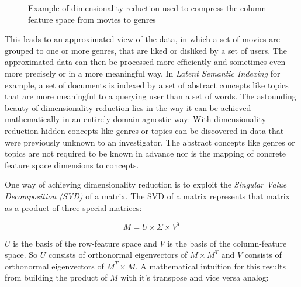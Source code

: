 \begin{figure}[h]
\centering
{}
\caption{Example of dimensionality reduction used to compress the column
feature space from movies to genres}
\label{fig:exmpl_dr}
\end{figure}

This leads to an approximated view of the data, in which a set of movies are
grouped to one or more genres, that are liked or disliked by a set of users.
The approximated data can then be processed more efficiently and sometimes even
more precisely or in a more meaningful way. In \textsl{Latent Semantic
Indexing} for example, a set of documents is indexed by a set of abstract
concepts like topics that are more meaningful to a querying user than a set of
words. The astounding beauty of dimensionality reduction lies in the way it can
be achieved mathematically in an entirely domain agnostic way: With
dimensionality reduction hidden concepts like genres or topics can be
discovered in data that were previously unknown to an investigator. The
abstract concepts like genres or topics are not required to be known in advance
nor is the mapping of concrete feature space dimensions to concepts.

One way of achieving dimensionality reduction is to exploit the
\textsl{Singular Value Decomposition (SVD)} of a matrix. The SVD of a matrix
represents that matrix as a product of three special matrices:

\begin{equation}
	M = U \times \Sigma \times V^T
\end{equation}

$U$ is the basis of the row-feature space and $V$ is the basis of the
column-feature space. So $U$ consists of orthonormal eigenvectors of $M\times
M^T$ and $V$ consists of orthonormal eigenvectors of $M^T\times M$. A
mathematical intuition for this results from building the product of $M$ with
it's transpose and vice versa analog:


